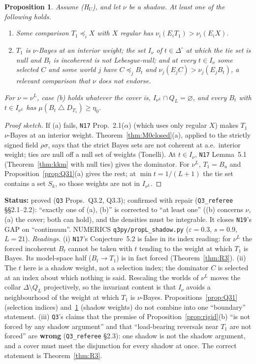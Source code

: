 \documentclass[11pt]{article}
\newtheorem{proposition}[theorem]{Proposition}
\theoremstyle{definition}
\theoremstyle{remark}
\newcommand{\Di}{\Delta^{\circ}}
\newcommand{\sd}{\mathbin{\triangle}}
\newcommand{\src}[1]{\texttt{#1}}
\newcommand{\status}[1]{\par\smallskip\noindent\textbf{Status:} #1\par\smallskip}
\begin{document}
\begin{proposition}\label{prop:Q32}
Assume (H$_U$), and let $\nu$ be a shadow. At least one of the following holds.
\begin{enumerate}[leftmargin=*,label=(\alph*)]
\item Some comparison $T_1\preceq_iX$ with $X$ regular has $\nu_i(E_iT_1)>\nu_i(E_iX)$.
\item $T_1$ is $\nu$-Bayes at an interior weight; the set $I_\nu$ of $t\in\Di$ at which the tie set is null and $B_t$ is incoherent is not Lebesgue-null; and at every $t\in I_\nu$ some selected $C$ and some world $j$ have $C\preceq_jB_t$ and $\nu_j(E_jC)>\nu_j(E_jB_t)$, a relevant comparison that $\nu$ does not endorse.
\end{enumerate}
For $\nu=\nu^L$, case (b) holds whatever the cover is, $I_{\nu^L}\cap Q_L=\varnothing$, and every $B_t$ with $t\in I_{\nu^L}$ has $\mu(B_t\sd D_{T_1})\ge\eta_0$.
\end{proposition}
\begin{proof}[Proof sketch]
If (a) fails, \src{N17} Prop.~2.1($\alpha$) (which uses only regular $X$) makes $T_1$ $\nu$-Bayes at an interior weight. Theorem~\ref{thm:M0closed}(a), applied to the strictly signed field $\rho\sigma$, says that the strict Bayes sets are not coherent at a.e.\ interior weight; ties are null off a null set of weights (Tonelli). At $t\in I_\nu$, \src{N17} Lemma~5.1 (Theorem~\ref{thm:kkm} with null ties) gives the dominator. For $\nu^L$, $T_1=B_u$ and Proposition~\ref{prop:Q31}(a) gives the rest; at $\min t=1/(L+1)$ the tie set contains a set $S_k$, so those weights are not in $I_{\nu^L}$.
\end{proof}
\status{proved (\src{Q3} Props.~Q3.2, Q3.3); confirmed with repair (\src{Q3\_referee} \S\S2.1--2.2): ``exactly one of (a), (b)'' is corrected to ``at least one'' ((b) concerns $\nu$, (a) the cover; both can hold), and the densities must be integrable. It closes \src{N19}'s GAP on ``continuum''. NUMERICS \src{q3py/propL\_shadow.py} ($\varepsilon=0.3$, $s=0.9$, $L=21$). \emph{Readings.} (i) \src{N17}'s Conjecture~5.2 is false in its index reading: for $\nu^L$ the forced incoherent $B_t$ cannot be taken with $t$ tending to the weight at which $T_1$ is Bayes. Its model-space half ($B_t\to T_1$) is in fact forced (Theorem~\ref{thm:R3}). (ii) The $t$ here is a shadow weight, not a selection index; the dominator $C$ is selected at an index about which nothing is said. Rescaling the worlds of $\nu^L$ moves the collar $\Delta\setminus Q_L$ projectively, so the invariant content is that $I_\nu$ avoids a neighbourhood of the weight at which $T_1$ is $\nu$-Bayes. Propositions~\ref{prop:Q31} (selection indices) and~\ref{prop:Q32} (shadow weights) do not combine into one ``boundary'' statement. (iii) \src{Q3}'s claims that the premise of Proposition~\ref{prop:rigid}(b) ``is not forced by any shadow argument'' and that ``load-bearing reversals near $T_1$ are not forced'' are \textbf{wrong} (\src{Q3\_referee} \S2.3): one shadow is not the shadow argument, and a cover must meet the disjunction for every shadow at once. The correct statement is Theorem~\ref{thm:R3}.}
\end{document}
